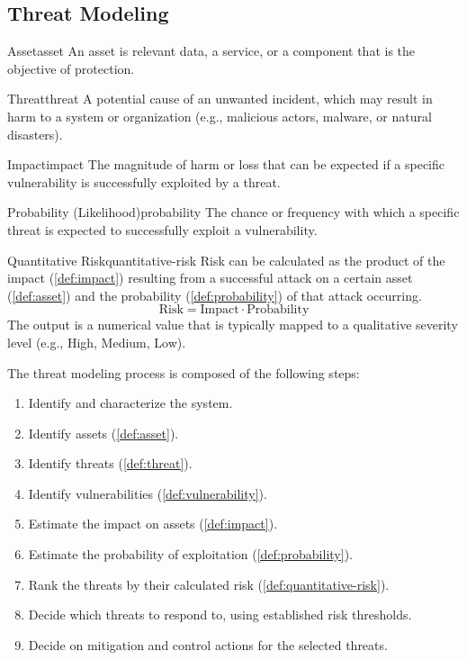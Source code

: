 \subsection{Threat Modeling}

\begin{definition}{Asset}{asset}
    An asset is relevant data, a service, or a component that is the objective of protection.
\end{definition}

\begin{definition}{Threat}{threat}
    A potential cause of an unwanted incident, which may result in harm to a system or organization (e.g., malicious actors, malware, or natural disasters).
\end{definition}

\begin{definition}{Impact}{impact}
    The magnitude of harm or loss that can be expected if a specific vulnerability is successfully exploited by a threat.
\end{definition}

\begin{definition}{Probability (Likelihood)}{probability}
    The chance or frequency with which a specific threat is expected to successfully exploit a vulnerability.
\end{definition}

\begin{definition}{Quantitative Risk}{quantitative-risk}
    Risk can be calculated as the product of the impact (\cref{def:impact}) resulting from a successful attack on a certain asset (\cref{def:asset}) and the probability (\cref{def:probability}) of that attack occurring.
    \[
        \text{Risk} = \text{Impact} \cdot \text{Probability}
    \]
    The output is a numerical value that is typically mapped to a qualitative severity level (e.g., High, Medium, Low).
\end{definition}

\noindent The threat modeling process is composed of the following steps:
\begin{enumerate}
    \item Identify and characterize the system.
    \item Identify assets (\cref{def:asset}).
    \item Identify threats (\cref{def:threat}).
    \item Identify vulnerabilities (\cref{def:vulnerability}).
    \item Estimate the impact on assets (\cref{def:impact}).
    \item Estimate the probability of exploitation (\cref{def:probability}).
    \item Rank the threats by their calculated risk (\cref{def:quantitative-risk}).
    \item Decide which threats to respond to, using established risk thresholds.
    \item Decide on mitigation and control actions for the selected threats. 
\end{enumerate}


